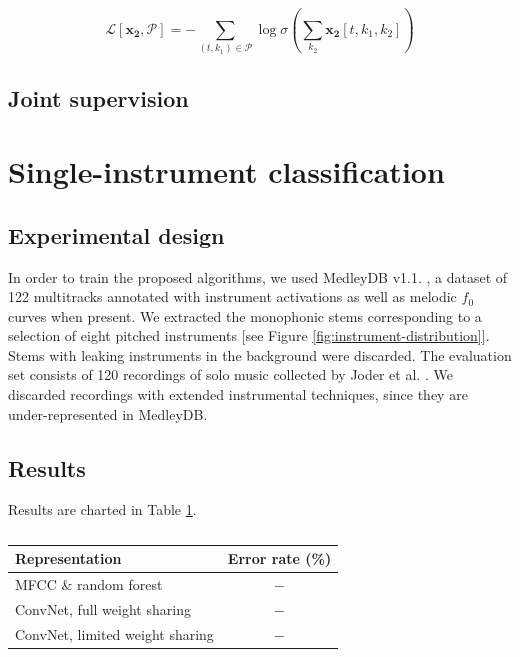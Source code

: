 \documentclass{article}
\begin{document}
\begin{equation}
\mathscr{L}[\boldsymbol{x_2}, \mathcal{P}] =
- \sum_{(t, k_1)\in\mathcal{P}} 
\log \sigma
\left( \sum_{k_2} \boldsymbol{x_2}[t,k_1,k_2] \right)
\end{equation}

\subsection{Joint supervision}


\section{Single-instrument classification}\label{sec:single-instrument}
\subsection{Experimental design}
In order to train the proposed algorithms, we used MedleyDB v1.1. \cite{Bittner2014}, a dataset of 122 multitracks annotated with instrument activations as well as melodic $f_0$ curves when present. We extracted the monophonic stems corresponding to a selection of eight pitched instruments [see Figure \ref{fig:instrument-distribution}]. Stems with leaking instruments in the background were discarded.
The evaluation set consists of 120 recordings of solo music collected by Joder et al. \cite{Joder2009}. We discarded recordings with extended instrumental techniques, since they are under-represented in MedleyDB.

\subsection{Results}
Results are charted in Table \ref{table:single-label-results}.

\begin{table}
	\begin{center}
	\begin{tabular}{|l|c|}
		\hline
		Representation & Error rate (\%) \\
		\hline
		MFCC \& random forest & $-$ \\
		ConvNet, full weight sharing & $-$ \\
		ConvNet, limited weight sharing & $-$ \\
		\hline
	\end{tabular}
	\end{center}
	\caption{\label{table:single-label-results}}
\end{table}
\end{document}

